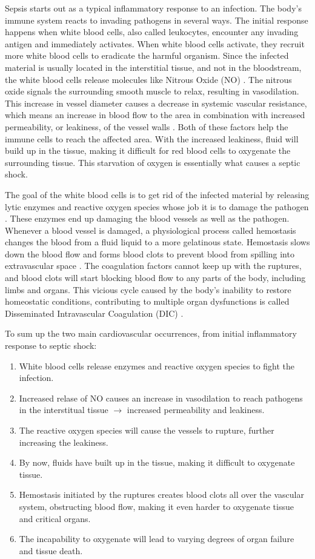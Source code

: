 Sepsis starts out as a typical inflammatory response to an infection. The body's immune system reacts to invading pathogens in several ways. The initial response happens when white blood cells, also called leukocytes, encounter any invading antigen and immediately activates. When white blood cells activate, they recruit more white blood cells to eradicate the harmful organism. Since the infected material is usually located in the interstitial tissue, and not in the bloodstream, the white blood cells release molecules like Nitrous Oxide (NO) \cite{RN9}. The nitrous oxide signals the surrounding smooth muscle to relax, resulting in vasodilation. This increase in vessel diameter causes a decrease in systemic vascular resistance, which means an increase in blood flow to the area in combination with increased permeability, or leakiness, of the vessel walls \cite{RN10}. Both of these factors help the immune cells to reach the affected area. With the increased leakiness, fluid will build up in the tissue, making it difficult for red blood cells to oxygenate the surrounding tissue. This starvation of oxygen is essentially what causes a septic shock. 

The goal of the white blood cells is to get rid of the infected material by releasing lytic enzymes and reactive oxygen species whose job it is to damage the pathogen \cite{RN13}. These enzymes end up damaging the blood vessels as well as the pathogen. Whenever a blood vessel is damaged, a physiological process called hemostasis changes the blood from a fluid liquid to a more gelatinous state. Hemostasis slows down the blood flow and forms blood clots to prevent blood from spilling into extravascular space \cite{RN12}. The coagulation factors cannot keep up with the ruptures, and blood clots will start blocking blood flow to any parts of the body, including limbs and organs. This vicious cycle caused by the body's inability to restore homeostatic conditions, contributing to multiple organ dysfunctions is called Disseminated Intravascular Coagulation (DIC) \cite{RN14}. 

To sum up the two main cardiovascular occurrences, from initial inflammatory response to septic shock: 
 \begin{enumerate}
    \item White blood cells release enzymes and reactive oxygen species to fight the infection.
    \item Increased relase of NO causes an increase in vasodilation to reach pathogens in the interstitual tissue $\longrightarrow$ increased permeability and leakiness.
   \item The reactive oxygen species will cause the vessels to rupture, further increasing the leakiness.
   \item By now, fluids have built up in the tissue, making it difficult to oxygenate tissue.
   \item Hemostasis initiated by the ruptures creates blood clots all over the vascular system, obstructing blood flow, making it even harder to oxygenate tissue and critical organs.
   \item The incapability to oxygenate will lead to varying degrees of organ failure and tissue death.
\end{enumerate}

